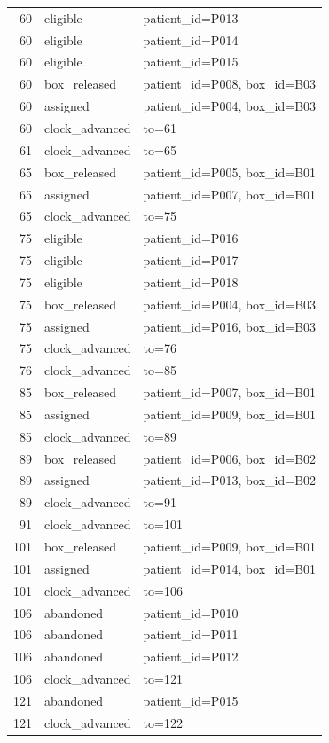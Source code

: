 \begin{longtable}{r p{2.2cm} p{4.2cm}}
60 & eligible & patient\_id=P013 \\
60 & eligible & patient\_id=P014 \\
60 & eligible & patient\_id=P015 \\
60 & box\_released & patient\_id=P008, box\_id=B03 \\
60 & assigned & patient\_id=P004, box\_id=B03 \\
60 & clock\_advanced & to=61 \\
61 & clock\_advanced & to=65 \\
65 & box\_released & patient\_id=P005, box\_id=B01 \\
65 & assigned & patient\_id=P007, box\_id=B01 \\
65 & clock\_advanced & to=75 \\
75 & eligible & patient\_id=P016 \\
75 & eligible & patient\_id=P017 \\
75 & eligible & patient\_id=P018 \\
75 & box\_released & patient\_id=P004, box\_id=B03 \\
75 & assigned & patient\_id=P016, box\_id=B03 \\
75 & clock\_advanced & to=76 \\
76 & clock\_advanced & to=85 \\
85 & box\_released & patient\_id=P007, box\_id=B01 \\
85 & assigned & patient\_id=P009, box\_id=B01 \\
85 & clock\_advanced & to=89 \\
89 & box\_released & patient\_id=P006, box\_id=B02 \\
89 & assigned & patient\_id=P013, box\_id=B02 \\
89 & clock\_advanced & to=91 \\
91 & clock\_advanced & to=101 \\
101 & box\_released & patient\_id=P009, box\_id=B01 \\
101 & assigned & patient\_id=P014, box\_id=B01 \\
101 & clock\_advanced & to=106 \\
106 & abandoned & patient\_id=P010 \\
106 & abandoned & patient\_id=P011 \\
106 & abandoned & patient\_id=P012 \\
106 & clock\_advanced & to=121 \\
121 & abandoned & patient\_id=P015 \\
121 & clock\_advanced & to=122 \\

\end{longtable}
